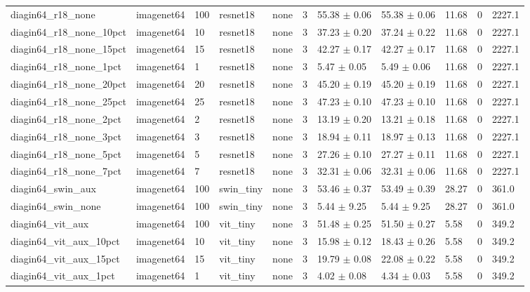 \begin{tabular}{lllllllllll}
diagin64_r18_none & imagenet64 & 100 & resnet18 & none & 3 & 55.38 $\pm$ 0.06 & 55.38 $\pm$ 0.06 & 11.68 & 0 & 2227.1 \\
diagin64_r18_none_10pct & imagenet64 & 10 & resnet18 & none & 3 & 37.23 $\pm$ 0.20 & 37.24 $\pm$ 0.22 & 11.68 & 0 & 2227.1 \\
diagin64_r18_none_15pct & imagenet64 & 15 & resnet18 & none & 3 & 42.27 $\pm$ 0.17 & 42.27 $\pm$ 0.17 & 11.68 & 0 & 2227.1 \\
diagin64_r18_none_1pct & imagenet64 & 1 & resnet18 & none & 3 & 5.47 $\pm$ 0.05 & 5.49 $\pm$ 0.06 & 11.68 & 0 & 2227.1 \\
diagin64_r18_none_20pct & imagenet64 & 20 & resnet18 & none & 3 & 45.20 $\pm$ 0.19 & 45.20 $\pm$ 0.19 & 11.68 & 0 & 2227.1 \\
diagin64_r18_none_25pct & imagenet64 & 25 & resnet18 & none & 3 & 47.23 $\pm$ 0.10 & 47.23 $\pm$ 0.10 & 11.68 & 0 & 2227.1 \\
diagin64_r18_none_2pct & imagenet64 & 2 & resnet18 & none & 3 & 13.19 $\pm$ 0.20 & 13.21 $\pm$ 0.18 & 11.68 & 0 & 2227.1 \\
diagin64_r18_none_3pct & imagenet64 & 3 & resnet18 & none & 3 & 18.94 $\pm$ 0.11 & 18.97 $\pm$ 0.13 & 11.68 & 0 & 2227.1 \\
diagin64_r18_none_5pct & imagenet64 & 5 & resnet18 & none & 3 & 27.26 $\pm$ 0.10 & 27.27 $\pm$ 0.11 & 11.68 & 0 & 2227.1 \\
diagin64_r18_none_7pct & imagenet64 & 7 & resnet18 & none & 3 & 32.31 $\pm$ 0.06 & 32.31 $\pm$ 0.06 & 11.68 & 0 & 2227.1 \\
diagin64_swin_aux & imagenet64 & 100 & swin_tiny & none & 3 & 53.46 $\pm$ 0.37 & 53.49 $\pm$ 0.39 & 28.27 & 0 & 361.0 \\
diagin64_swin_none & imagenet64 & 100 & swin_tiny & none & 3 & 5.44 $\pm$ 9.25 & 5.44 $\pm$ 9.25 & 28.27 & 0 & 361.0 \\
diagin64_vit_aux & imagenet64 & 100 & vit_tiny & none & 3 & 51.48 $\pm$ 0.25 & 51.50 $\pm$ 0.27 & 5.58 & 0 & 349.2 \\
diagin64_vit_aux_10pct & imagenet64 & 10 & vit_tiny & none & 3 & 15.98 $\pm$ 0.12 & 18.43 $\pm$ 0.26 & 5.58 & 0 & 349.2 \\
diagin64_vit_aux_15pct & imagenet64 & 15 & vit_tiny & none & 3 & 19.79 $\pm$ 0.08 & 22.08 $\pm$ 0.22 & 5.58 & 0 & 349.2 \\
diagin64_vit_aux_1pct & imagenet64 & 1 & vit_tiny & none & 3 & 4.02 $\pm$ 0.08 & 4.34 $\pm$ 0.03 & 5.58 & 0 & 349.2 \\

\end{tabular}
